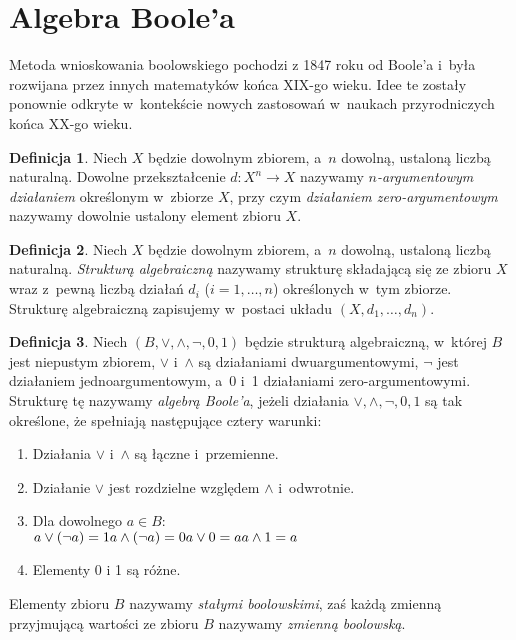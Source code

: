 \documentclass[a4paper,11pt,twoside]{article}
\theoremstyle{definition}
\newtheorem{df}{Definicja}
\begin{document}
\section* {Algebra Boole'a}


Metoda wnioskowania boolowskiego pochodzi z 1847 roku od Boole'a i~była rozwijana przez innych matematyków końca XIX-go wieku. Idee te zostały ponownie odkryte w~kontekście nowych zastosowań w~naukach przyrodniczych końca XX-go wieku.
\begin{df}
Niech $X$ będzie dowolnym zbiorem, a~$n$ dowolną, ustaloną liczbą naturalną. Dowolne przekształcenie $d\colon X^n \to X$ nazywamy {\em $n$-argumentowym działaniem} określonym w~zbiorze $X$, przy czym {\em działaniem zero-argumentowym} nazywamy dowolnie ustalony element zbioru $X$.
\end{df}

\begin{df}
Niech $X$ będzie dowolnym zbiorem, a~$n$ dowolną, ustaloną liczbą naturalną. {\em Strukturą algebraiczną} nazywamy strukturę składającą się ze zbioru $X$ wraz z~pewną liczbą działań $d_i$ ($i = 1,\dots,n$) określonych w~tym zbiorze. Strukturę algebraiczną zapisujemy w~postaci układu $(X,d_1,\dots,d_n)$.
\end{df}

\begin{df}
Niech $(B,\vee,\wedge,\neg,0,1)$ będzie strukturą algebraiczną, w~której $B$ jest niepustym zbiorem, $\vee$ i~$\wedge$ są działaniami dwuargumentowymi, $\neg$ jest działaniem jednoargumentowym, a~0 i~1 działaniami zero-argumentowymi. Strukturę tę nazywamy {\em algebrą Boole'a}, jeżeli działania $\vee,\wedge,\neg,0,1$ są tak określone, że spełniają następujące cztery warunki:

\begin{enumerate}

	\item Działania $\vee$ i~$\wedge$ są łączne i~przemienne.

	\item Działanie $\vee$ jest rozdzielne względem $\wedge$ i~odwrotnie.

	\item Dla dowolnego $a \in B$:\\
		$
		a \vee (\neg a) = 1 \\
		a \wedge (\neg a) = 0\\
		a \vee 0 = a\\
		a \wedge 1 = a
		$

	\item Elementy 0 i 1 są różne.

\end{enumerate}
\end{df}
Elementy zbioru $B$ nazywamy {\em stałymi boolowskimi}, zaś każdą zmienną przyjmującą wartości ze zbioru $B$ nazywamy {\em zmienną boolowską}.
\end{document}
